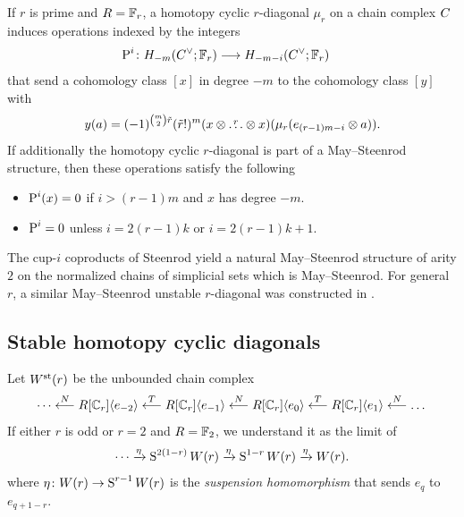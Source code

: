 \begin{proposition}\cite{may1970general}\label{prop:unstable}
	If $r$ is prime and $R=\mathbb{F}_r$, a homotopy cyclic $r$-diagonal $\mu_r$ on a chain complex $C_{}$ induces operations indexed by the integers
	\begin{align*}
		\operatorname{P}^{i} \colon H_{-m}(C^\vee_{};\mathbb{F}_r)& \longrightarrow H_{-m-i}(C^\vee_{};\mathbb{F}_r)
	\end{align*}
	that send a cohomology class $[x]$ in degree $-m$ to the cohomology class $[y]$ with
	\[
	y(a) = (-1)^{\binom{m}{2} \tilde{r}}(\tilde{r}!)^m(x \otimes \overset{r}{\dots} \otimes x)(\mu_r(e_{(r-1)m-i} \otimes a)).
	\]
	If additionally the homotopy cyclic $r$-diagonal is part of a May--Steenrod structure, then these operations satisfy the following
	\begin{itemize}
		\item $\operatorname{P}^i(x) = 0$ if $i>(r-1)m$ and $x$ has degree $-m$.
		\item $\operatorname{P}^i = 0$ unless $i = 2(r-1)k$ or $i = 2(r-1)k+1$.
	\end{itemize}
\end{proposition}
%

\begin{example}
	The cup-$i$ coproducts of Steenrod \cite{steenrod1947products, medina2022axiomatic} yield a natural May--Steenrod structure of arity $2$ on the normalized chains of simplicial sets which is May--Steenrod.
	For general $r$, a similar May--Steenrod unstable $r$-diagonal was constructed in \cite{medina2021may_st}.
\end{example}

\subsection{Stable homotopy cyclic diagonals}\label{s:stable}

Let $W^{\mathrm{st}}_{}(r)$ be the unbounded chain complex
\[
\dotsb \overset{N}{\longleftarrow} R[\mathbb{C}_r]\langle e_{-2}\rangle
\overset{T}{\longleftarrow}
R[\mathbb{C}_r]\langle e_{-1}\rangle
\overset{N}{\longleftarrow}
R[\mathbb{C}_r]\langle e_0\rangle
\overset{T}{\longleftarrow}
R[\mathbb{C}_r]\langle e_{1}\rangle
\overset{N}{\longleftarrow}
\dots
\]
If either $r$ is odd or $r=2$ and $R=\mathbb{F}_2$, we understand it as the limit of
\[
\dotsb \xrightarrow{\eta} \operatorname{S}^{2(1-r)}W(r) \xrightarrow{\eta} \operatorname{S}^{1-r} W(r) \xrightarrow{\eta} W(r).
\]
where $\eta \colon W(r) \to \operatorname{S}^{r-1}W(r)$ is the \emph{suspension homomorphism} that sends $e_{q}$ to $e_{q+1-r}$. 

